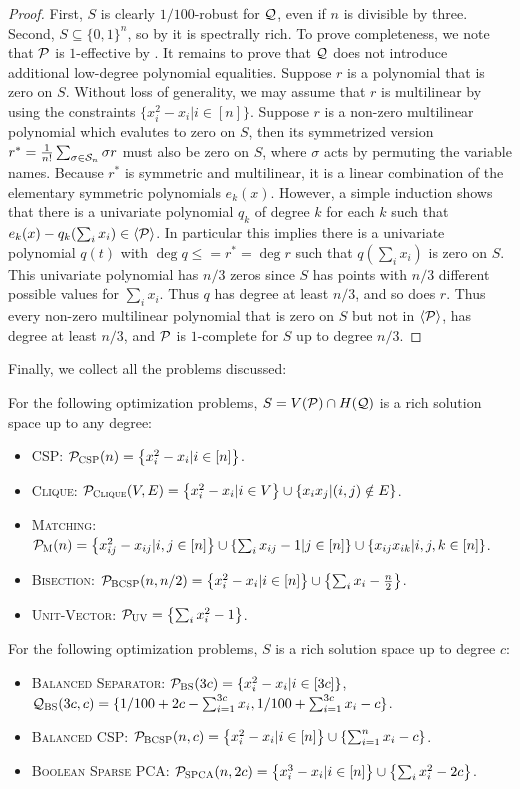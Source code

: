 \begin{proof}
First, $S$ is clearly $1/100$-robust for $\mathcal Q$, even if $n$ is divisible by three. Second, $S \subseteq \{0,1\}^n$, so by  it is spectrally rich. To prove completeness, we note that $\mathcal P$ is $1$-effective by . It remains to prove that $\mathcal Q$ does not introduce additional low-degree polynomial equalities. 
Suppose $r$ is a polynomial that is zero on $S$.  
Without loss of generality, we may assume that $r$ is multilinear by using the constraints $\{x_i^2 - x_i | i \in [n]\}$.
Suppose $r$ is a non-zero multilinear polynomial which evalutes to zero on $S$, then its symmetrized version $r^* = \frac{1}{n!}\sum_{\sigma \in \mathcal S_n} \sigma r$ must also be zero on $S$, where $\sigma$ acts by permuting the variable names. Because $r^*$ is symmetric and multilinear, it is a linear combination of the elementary symmetric polynomials $e_k(x)$. However, a simple induction shows that there is a univariate polynomial $q_k$ of degree $k$ for each $k$ such that $e_k(x) - q_k(\sum_i x_i) \in \langle \mathcal P \rangle$. In particular this implies there is a univariate polynomial $q(t)$ with $\deg q \leq = r^* = \deg r$ such that $q(\sum_i x_i)$ is zero on $S$.
This univariate polynomial has $n/3$ zeros since $S$ has points with $n/3$ different possible values for $\sum_i x_i$. Thus $q$ has degree at least $n/3$, and so does $r$. Thus every non-zero multilinear polynomial that is zero on $S$ but not in $\langle \mathcal P\rangle$, has degree at least $n/3$, and $\mathcal P$ is $1$-complete for $S$ up to degree $n/3$.
\end{proof}
Finally, we collect all the problems discussed:
\begin{corollary}\label{cor:examples}
For the following optimization problems, $S = V(\mathcal P) \cap H(\mathcal Q)$ is a rich solution space up to any degree:
\begin{itemize}
\item \textsc{CSP}: $\mathcal P_{\textsc{CSP}}(n) = \left\{x_i^2 - x_i | i \in [n]\right\}$. 
\item \textsc{Clique}: $\mathcal P_{\textsc{Clique}}(V,E) = \left\{x_i^2 - x_i | i \in V\right\} \cup \left\{x_ix_j | (i,j) \notin E\right\}$.
\item \textsc{Matching}: $\mathcal P_{\textsc{M}}(n) = \left\{x_{ij}^2 - x_{ij} | i,j \in [n]\right\} \cup \left\{\sum_i x_{ij} - 1 | j \in [n]\right\} \cup \left\{x_{ij}x_{ik} | i,j,k \in [n]\right\}$.
\item \textsc{Bisection}: $\mathcal P_{\textsc{BCSP}}(n,n/2) = \left\{x_i^2 - x_i | i \in [n]\right\} \cup \left\{\sum_i x_i - \frac{n}{2}\right\}$.
\item \textsc{Unit-Vector}: $\mathcal P_{\textsc{UV}} = \left\{\sum_i x_i^2 - 1\right\}$.
\end{itemize}
For the following optimization problems, $S$ is a rich solution space up to degree $c$:
\begin{itemize}
\item \textsc{Balanced Separator}: $\mathcal P_{\textsc{BS}}(3c) = \{x_i^2 - x_i | i \in [3c]\}$, $\mathcal Q_{\textsc{BS}}(3c,c) = \{1/100 + 2c - \sum_{i=1}^{3c} x_i, 1/100 + \sum_{i=1}^{3c} x_i - c\}$.
\item \textsc{Balanced CSP}: $\mathcal P_{\textsc{BCSP}}(n,c) = \left\{x_i^2 - x_i | i \in [n]\right\} \cup \left\{\sum_{i=1}^n x_i - c\right\}$.
\item \textsc{Boolean Sparse PCA}: $\mathcal P_{\textsc{SPCA}}(n,2c) = \left\{x_i^3 - x_i | i \in [n]\right\} \cup \left\{\sum_i x_i^2 - 2c\right\}$.
\end{itemize}
\end{corollary}
